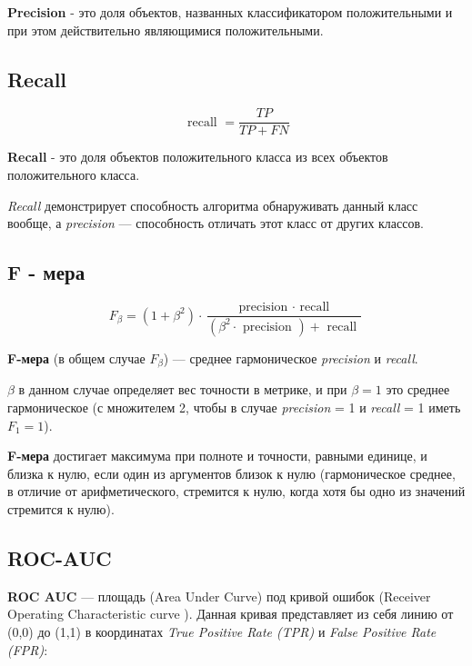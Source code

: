\textbf{Precision} - это доля объектов, названных классификатором положительными и при этом действительно являющимися положительными.

\subsection{Recall}
$$
\text { recall }=\frac{T P}{T P+F N}
$$

\textbf{Recall} - это доля объектов положительного класса из всех объектов положительного класса.

\textit{Recall} демонстрирует способность алгоритма обнаруживать данный класс вообще, а \textit{precision} — способность отличать этот класс от других классов.

\subsection{F - мера}
$$
F_{\beta}=\left(1+\beta^{2}\right) \cdot \frac{\text { precision } \cdot \text { recall }}{\left(\beta^{2} \cdot \text { precision }\right)+\text { recall }}
$$

\textbf{F-мера} (в общем случае $F_{\beta}$) — среднее гармоническое \textit{precision} и \textit{recall}.

$\beta$ в данном случае определяет вес точности в метрике, и при $\beta=1$ это среднее гармоническое (с множителем 2, чтобы в случае \textit{precision} = 1 и \textit{recall} = 1 иметь $F_{1}=1$).

\textbf{F-мера} достигает максимума при полноте и точности, равными единице, и близка к нулю, если один из аргументов близок к нулю (гармоническое среднее, в отличие от арифметического, стремится к нулю, когда хотя бы одно из значений стремится к нулю).

\subsection{ROC-AUC}

\textbf{ROC AUC} — площадь (Area Under Curve) под кривой ошибок (Receiver Operating Characteristic curve ). Данная кривая представляет из себя линию от (0,0) до (1,1) в координатах \textit{True Positive Rate (TPR)} и \textit{False Positive Rate (FPR)}:

